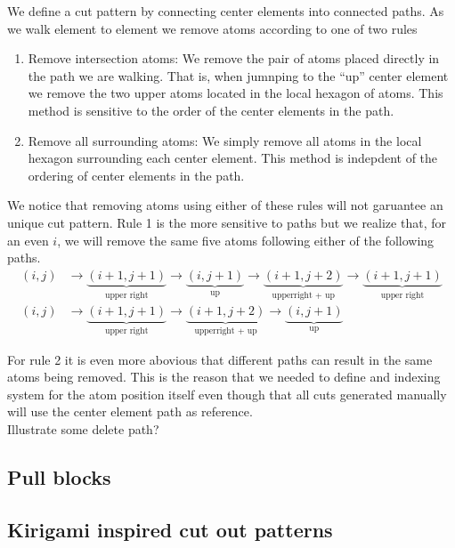 We define a cut pattern by connecting center elements into connected paths. As
we walk element to element we remove atoms according to one of two rules 
\begin{enumerate}
  \item Remove intersection atoms: We remove the pair of atoms placed directly
  in the path we are walking. That is, when jumnping to the ``up'' center
  element we remove the two upper atoms located in the local hexagon of atoms.
  This method is sensitive to the order of the center elements in the path. 
  \item Remove all surrounding atoms: We simply remove all atoms in the local
  hexagon surrounding each center element. This method is indepdent of the
  ordering of center elements in the path.
\end{enumerate}

We notice that removing atoms using either of these rules will not garuantee an
unique cut pattern. Rule 1 is the more sensitive to paths but we realize that,
for an even $i$, we will remove the same five atoms following either of the
following paths.
\begin{align*}
  (i, j) &\rightarrow \underbrace{(i+1,j+1)}_{\text{upper right}} \rightarrow \underbrace{(i, j+1)}_{\text{up}} \rightarrow \underbrace{(i+1, j+2)}_{\text{upperright + up}} \rightarrow \underbrace{(i+1, j+1)}_{\text{upper right}} \\
  (i, j) &\rightarrow \underbrace{(i+1,j+1)}_{\text{upper right}} \rightarrow \underbrace{(i+1, j+2)}_{\text{upperright + up}} \rightarrow \underbrace{(i, j+1)}_{\text{up}}
\end{align*}

For rule 2 it is even more abovious that different paths can result in the same
atoms being removed. This is the reason that we needed to define and indexing
system for the atom position itself even though that all cuts generated manually
will use the center element path as reference. \\

Illustrate some delete path?




\subsection{Pull blocks}

\subsection{Kirigami inspired cut out patterns}

